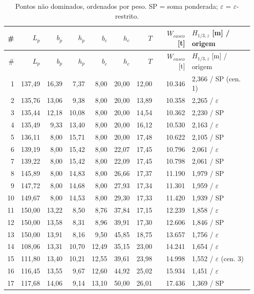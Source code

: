 \documentclass[11pt,a4paper]{article}
\newcommand{\Hz}{H_{1/3,z}}
\begin{document}
\begin{longtable}{rrrrrrrrl}
\caption{Pontos não dominados, ordenados por peso. SP = soma ponderada; $\varepsilon$ =
$\varepsilon$-restrito.}\label{tab:fronteira}\\
\toprule
\# & $L_p$ & $b_p$ & $h_p$ & $b_c$ & $h_c$ & $T$ & $W_{casco}$ [t] & $\Hz$ [m] / origem \\
\midrule
\endfirsthead
\toprule
\# & $L_p$ & $b_p$ & $h_p$ & $b_c$ & $h_c$ & $T$ & $W_{casco}$ [t] & $\Hz$ [m] / origem \\
\midrule
\endhead
1 & 137,49 & 16,39 & 7,37 & 8,00 & 20,00 & 12,00 & 10.346 & 2,366 / SP (cen. 1) \\
2 & 135,76 & 13,06 & 9,38 & 8,00 & 20,00 & 13,89 & 10.358 & 2,265 / $\varepsilon$ \\
3 & 135,44 & 12,18 & 10,08 & 8,00 & 20,00 & 14,54 & 10.362 & 2,230 / SP \\
4 & 135,49 & 9,33 & 13,40 & 8,00 & 20,00 & 16,12 & 10.530 & 2,163 / $\varepsilon$ \\
5 & 136,11 & 8,00 & 15,71 & 8,00 & 20,00 & 17,48 & 10.622 & 2,105 / SP \\
6 & 139,19 & 8,00 & 15,42 & 8,00 & 22,07 & 17,45 & 10.796 & 2,061 / $\varepsilon$ \\
7 & 139,22 & 8,00 & 15,42 & 8,00 & 22,09 & 17,45 & 10.798 & 2,061 / SP \\
8 & 145,89 & 8,00 & 14,83 & 8,00 & 26,66 & 17,37 & 11.190 & 1,979 / SP \\
9 & 147,72 & 8,00 & 14,68 & 8,00 & 27,93 & 17,34 & 11.301 & 1,959 / $\varepsilon$ \\
10 & 149,67 & 8,00 & 14,53 & 8,00 & 29,30 & 17,33 & 11.420 & 1,939 / SP \\
11 & 150,00 & 13,22 & 8,50 & 8,76 & 37,84 & 17,15 & 12.239 & 1,858 / $\varepsilon$ \\
12 & 150,00 & 13,58 & 8,31 & 8,96 & 39,91 & 17,30 & 12.606 & 1,846 / SP \\
13 & 150,00 & 13,91 & 8,16 & 9,50 & 45,85 & 18,75 & 13.657 & 1,756 / $\varepsilon$ \\
14 & 108,06 & 13,31 & 10,70 & 12,49 & 35,15 & 23,00 & 14.241 & 1,654 / $\varepsilon$ \\
15 & 111,80 & 13,40 & 10,21 & 12,55 & 39,61 & 23,98 & 14.998 & 1,552 / $\varepsilon$ (cen. 3) \\
16 & 116,45 & 13,55 & 9,67 & 12,60 & 44,92 & 25,02 & 15.934 & 1,451 / $\varepsilon$ \\
17 & 117,68 & 14,06 & 9,14 & 13,10 & 50,00 & 26,01 & 17.436 & 1,369 / SP \\

\end{longtable}
\end{document}
